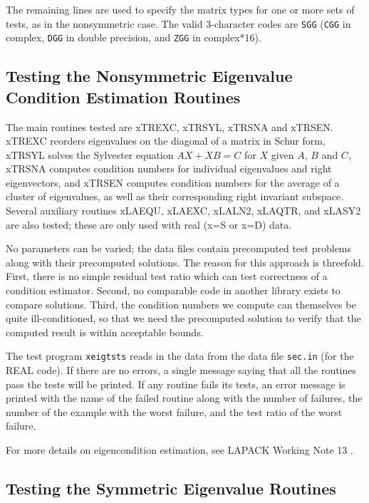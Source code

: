 \noindent
The remaining lines are used to specify the matrix types for one
or more sets of tests, as in the nonsymmetric case.
The valid 3-character codes are {\tt SGG} ({\tt CGG}
in complex, {\tt DGG} in double precision, and {\tt ZGG} in complex*16).

\subsection{Testing the Nonsymmetric Eigenvalue Condition Estimation
Routines}

\dent
The main routines tested are xTREXC, xTRSYL, xTRSNA and xTRSEN.
xTREXC reorders eigenvalues on the diagonal of a matrix in Schur form,
xTRSYL solves the Sylvester equation $AX+XB=C$ for $X$ given $A$, $B$
and
$C$, xTRSNA computes condition numbers for individual eigenvalues and
right eigenvectors, and xTRSEN computes condition numbers for the
average of
a cluster of eigenvalues, as well as their corresponding right
invariant subspace. Several auxiliary routines xLAEQU, xLAEXC, xLALN2,
xLAQTR, and xLASY2 are also tested; these are only used with real
(x=S or x=D) data.

No parameters can be varied; the data files contain precomputed test
problems along with their precomputed solutions. The reason for this
approach is threefold. First, there is no simple residual test ratio
which can
test correctness of a condition estimator. Second, no comparable code
in another library exists to compare solutions. Third, the condition
numbers we compute can themselves be quite ill-conditioned, so that
we need the precomputed solution to verify that the computed result
is within acceptable bounds.

The test program {\tt xeigtsts} reads in the data from the data file {\tt sec.in}
(for the REAL code).
If there are no errors, a single message saying that all the routines
pass
the tests will be printed.
If any routine fails its tests, an error message is printed with the name of the
failed routine along with the number of failures, the number of the
example
with the worst failure, and the test ratio of the worst failure.

For more details on eigencondition estimation, see LAPACK Working Note 13
\cite{WN13}.

\subsection{Testing the Symmetric Eigenvalue Routines}

